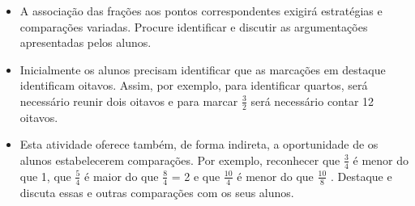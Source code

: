 \begin{orientacoes}{}{}
\begin{itemize}
     \item  A associação das frações aos pontos correspondentes exigirá estratégias e comparações variadas. Procure identificar e discutir as argumentações apresentadas pelos alunos.
     \item  Inicialmente os alunos precisam identificar que as marcações em destaque identificam oitavos. Assim, por exemplo, para identificar quartos, será necessário reunir dois oitavos e para marcar   $\frac{3}{2}$   será necessário contar 12 oitavos.
     \item  Esta atividade oferece também, de forma indireta, a oportunidade de os alunos estabelecerem comparações. Por exemplo, reconhecer que   $\frac{3}{4}$   é menor do que 1, que   $\frac{5}{4}$   é maior do que   $\frac{8}{4}$   = 2 e que   $\frac{10}{4}$   é menor do que   $\frac{10}{8}$  . Destaque e discuta essas e outras comparações com os seus alunos.
\end{itemize}
\end{orientacoes}

